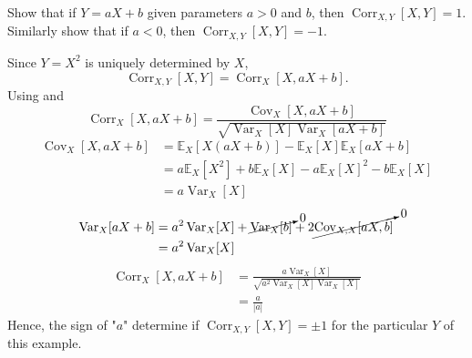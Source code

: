 \begin{example}
	Show that if $Y=aX+b$ given parameters $a>0$ and $b$, then $\operatorname{Corr}_{X,Y}[X,Y]=1$. Similarly show that if $a<0$, then $\operatorname{Corr}_{X,Y}[X,Y]=-1$.\newline
	
	Since $Y=X^2$ is uniquely determined by $X$,
	\begin{equation}
		\operatorname{Corr}_{X,Y}[X,Y] = \operatorname{Corr}_{X}[X,aX+b].
	\end{equation}
	Using  and 
	\begin{equation}
		\operatorname{Corr}_{X}[X,aX+b] = \frac{\operatorname{Cov}_{X}[X,aX+b]}{\sqrt{\operatorname{Var}_X[X]\operatorname{Var}_X[aX+b]}}
	\end{equation}
	\begin{equation}
		\begin{split}
			\operatorname{Cov}_{X}[X,aX+b] & = \mathbb{E}_{X}[X(aX+b)]-\mathbb{E}_X[X]\mathbb{E}_X[aX+b]\\
			&= a\mathbb{E}_X[X^2]+b\mathbb{E}_X[X]-a\mathbb{E}_X[X]^2-b\mathbb{E}_X[X]\\
			&=a\operatorname{Var}_X[X]
		\end{split}
	\end{equation}
	\begin{equation}
		\begin{split}
			\operatorname{Var}_X[aX+b] &= a^2\operatorname{Var}_X[X]+\cancelto{0}{\operatorname{Var}_X[b]}+2\cancelto{0}{\operatorname{Cov}_{X,X}[aX,b]}\\
			& = a^2\operatorname{Var}_X[X]
		\end{split}
	\end{equation}
	\begin{equation}
		\begin{split}
			\operatorname{Corr}_{X}[X,aX+b] &= \frac{a\operatorname{Var}_X[X]}{\sqrt{a^2\operatorname{Var}_X[X]\operatorname{Var}_X[X]}}\\
			&=\frac{a}{|a|}		
		\end{split}
	\end{equation}
	Hence, the sign of "$a$" determine if $\operatorname{Corr}_{X,Y}[X,Y]=\pm 1$ for the particular $Y$ of this example.
\end{example}

